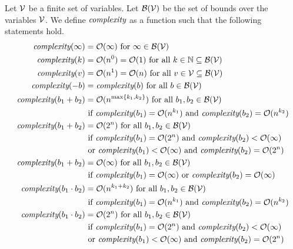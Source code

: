 \begin{theorem}
  \allowdisplaybreaks
  Let $\mathcal{V}$ be a finite set of variables.
  Let $\mathcal{B}(\mathcal{V})$ be the set of bounds over the variables $\mathcal{V}$.
  We define $\emph{complexity}$ as a function such that the following statements hold.
  \begin{align*}
    \complexity(\infty) &= \landau(\infty) \text{ for } \infty \in \BoundSet(\VSet) \\
    \complexity(k) &= \landau(n^0) = \landau(1) \text{ for all } k \in \mathbb{N} \subseteq \BoundSet(\VSet) \\
    \complexity(v) &= \landau(n^1) = \landau(n) \text{ for all } v \in \VSet \subseteq \BoundSet(\VSet) \\
    \complexity(-b) &= \complexity(b) \text{ for all } b \in \BoundSet(\VSet) \\
    \complexity(b_1 + b_2) &= \landau(n^{\maximum{k_1, k_2}}) \text{ for all } b_1, b_2 \in \BoundSet(\VSet) \\
    & \text{ if } \complexity(b_1)=\landau(n^{k_1}) \text{ and } \complexity(b_2)=\landau(n^{k_2}) \\
    \complexity(b_1 + b_2) &= \landau(2^n) \text{ for all } b_1, b_2 \in \BoundSet(\VSet) \\
    & \text{ if } \complexity(b_1)=\landau(2^n) \text{ and } \complexity(b_2)<\landau(\infty) \\
    & \text{ or } \complexity(b_1)<\landau(\infty) \text{ and } \complexity(b_2)=\landau(2^n) \\
    \complexity(b_1 + b_2) &= \landau(\infty) \text{ for all } b_1, b_2 \in \BoundSet(\VSet) \\
    & \text{ if } \complexity(b_1)=\landau(\infty) \text{ or } \complexity(b_2)=\landau(\infty) \\
    \complexity(b_1 \cdot b_2) &= \landau(n^{k_1 + k_2}) \text{ for all } b_1, b_2 \in \BoundSet(\VSet) \\
    & \text{ if } \complexity(b_1)=\landau(n^{k_1}) \text{ and } \complexity(b_2)=\landau(n^{k_2}) \\
    \complexity(b_1 \cdot b_2) &= \landau(2^n) \text{ for all } b_1, b_2 \in \BoundSet(\VSet) \\
    & \text{ if } \complexity(b_1)=\landau(2^n) \text{ and } \complexity(b_2)<\landau(\infty) \\
    & \text{ or } \complexity(b_1)<\landau(\infty) \text{ and } \complexity(b_2)=\landau(2^n) \\

\end{align*}
\end{theorem}

